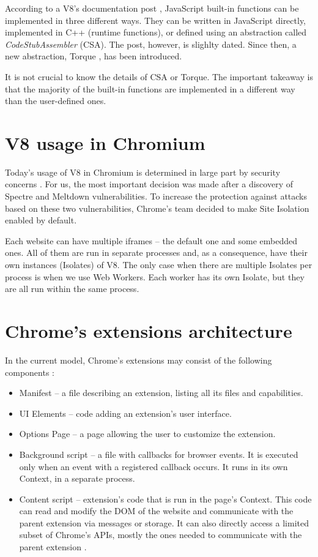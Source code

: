 According to a V8's documentation post \cite{v8:built-ins}, JavaScript built-in functions can be implemented
in three different ways. They can be written in JavaScript directly, implemented in C++ (runtime functions),
or defined using an abstraction called \emph{CodeStubAssembler} (CSA). 
The post, however, is slighlty dated. Since then, a new abstraction, Torque \cite{v8:torque}, has been introduced.

It is not crucial to know the details of CSA or Torque. The important takeaway is that
the majority of the built-in functions are implemented in a different way than the user-defined ones.


\section{V8 usage in Chromium}
\label{v8-in-chrome}

Today's usage of V8 in Chromium is determined in large part by security concerns \cite{v8:spectre}.
For us, the most important decision was made after a discovery of Spectre \cite{Kocher2018spectre} 
and Meltdown \cite{Lipp2018meltdown} vulnerabilities.
To increase the protection against attacks based on these two vulnerabilities, Chrome's team decided to make
Site Isolation enabled by default. \cite{chrome:site-isolation}

Each website can have multiple iframes -- the default one and some embedded ones. All of them
are run in separate processes and, as a consequence, have their own instances (Isolates) of V8.
The only case when there are multiple Isolates per process is when we use Web Workers.
Each worker has its own Isolate, but they are all run within the same process.

\section{Chrome's extensions architecture}

In the current model, Chrome's extensions may consist of the following components \cite{chrome:extensions}:
\begin{itemize}
  \item Manifest -- a file describing an extension, listing all its files and capabilities.
  \item UI Elements -- code adding an extension's user interface.
  \item Options Page -- a page allowing the user to customize the extension.
  \item Background script -- a file with callbacks for browser events. It is executed only when an event with a registered callback occurs.
           It runs in its own Context, in a separate process.
  \item Content script -- extension's code that is run in the page's Context. This code can read and modify the DOM
           of the website and communicate with the parent extension via messages or storage.
           It can also directly access a limited subset of Chrome's APIs, mostly the ones needed to communicate
           with the parent extension \cite{chrome:content-scripts}.
\end{itemize}


